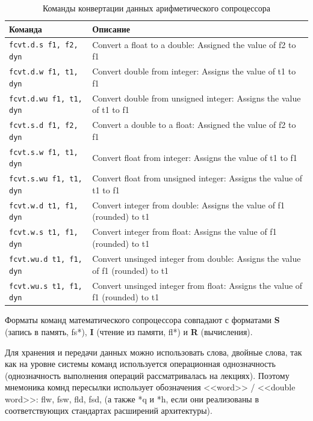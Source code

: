 \begin{table}[h]
    \caption{Команды конвертации данных арифметического сопроцессора}
    \centering
    \begin{tabularx}{\textwidth}{|l|X|}
        \hline
        \textbf{Команда} & \textbf{Описание} \\
        \hline \verb|fcvt.d.s f1, f2, dyn| & Convert a float to a double: Assigned the value of f2 to f1 \\
        \hline \verb|fcvt.d.w f1, t1, dyn| & Convert double from integer: Assigns the value of t1 to f1 \\
        \hline \verb|fcvt.d.wu f1, t1, dyn| & Convert double from unsigned integer: Assigns the value of t1 to f1 \\
        \hline \verb|fcvt.s.d f1, f2, dyn| & Convert a double to a float: Assigned the value of f2 to f1 \\
        \hline \verb|fcvt.s.w f1, t1, dyn| & Convert float from integer: Assigns the value of t1 to f1 \\
        \hline \verb|fcvt.s.wu f1, t1, dyn| & Convert float from unsigned integer: Assigns the value of t1 to f1 \\
        \hline \verb|fcvt.w.d t1, f1, dyn| & Convert integer from double: Assigns the value of f1 (rounded) to t1 \\
        \hline \verb|fcvt.w.s t1, f1, dyn| & Convert integer from float: Assigns the value of f1 (rounded) to t1 \\
        \hline \verb|fcvt.wu.d t1, f1, dyn| & Convert unsinged integer from double: Assigns the value of f1 (rounded) to t1 \\
        \hline \verb|fcvt.wu.s t1, f1, dyn| & Convert unsinged integer from float: Assigns the value of f1 (rounded) to t1 \\
        \hline
    \end{tabularx}
    \label{table-fp-processor-convert}
\end{table}


Форматы команд математического сопроцессора совпадают с форматами \textbf{S} (запись в память, fs*), \textbf{I} (чтение из памяти, fl*) и \textbf{R} (вычисления).

Для хранения и передачи данных можно использовать слова, двойные слова, так как на уровне системы команд используется операционная однозначность (однозначность выполнения операций рассматривалась на лекциях). Поэтому мнемоника комнд пересылки использует обозначения <<word>> / <<double word>>: flw, fsw, fld, fsd, (а также *q и *h, если они реализованы в соответствующих стандартах расширений архитектуры).

